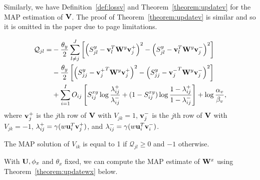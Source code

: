 Similarly, we have Definition~\ref{def:lossv} and Theorem~\ref{theorem:updatev} for the \mbox{MAP} estimation of $ {\bf V} $. The proof of Theorem~\ref{theorem:updatev} is similar and so it is omitted in the paper due to page limitations.

\begin{mydef}
\begin{align}
\mathcal{Q}_{jl} =&-\frac{\theta_{y}}{2}\sum_{l\neq j}^{J}\left[\left(S^{y}_{jl}-{\bf v}_l^T{\bf W}^y{\bf v}_{j}^{+}\right)^2-\left(S^{y}_{jl}-{\bf v}_l^T{\bf W}^y{\bf v}_{j}^{-}\right)^2\right]\nonumber\\
&-\frac{\theta_{y}}{2}\left[\left(S^{y}_{jj}-{{\bf v}_{j}^{+}}^T{\bf W}^y{\bf v}_{j}^{+}\right)^2-\left(S^{y}_{jj}-{{\bf v}_{j}^{-}}^T{\bf W}^y{\bf v}_{j}^{-}\right)^2\right]\nonumber\\
&+\sum_{i=1}^{I}O_{ij}\left[S_{ij}^{xy}\log \frac{\lambda_{ij}^{+}}{\lambda_{ij}^{-}} + (1-S_{ij}^{xy})\log \frac{1-\lambda_{ij}^{+}}{1-\lambda_{ij}^{-}}\right]+\log\frac{\alpha_v}{\beta_v},\nonumber
\end{align}
where $ {\bf v}^{+}_j $ is the $ j $th row of $ {\bf V}  $ with $ V_{jk}=1 $, $ {\bf v}^{-}_j $ is the $ j $th row of $ {\bf V} $ with $ V_{jk}=-1 $, $ \lambda^{+}_{ij} = \gamma(w{\bf u}_i^T{\bf v}_j^{+}) $, and $ \lambda^{-}_{ij} = \gamma(w{\bf u}_i^T{\bf v}_i^{-}) $.
\label{def:lossv}\end{mydef}


\begin{mythe}
The \mbox{MAP} solution of $ V_{ik} $ is equal to 1 if $ \mathcal{Q}_{jl}\ge 0$ and $-1$ otherwise.
\label{theorem:updatev}\end{mythe}

With $ {\bf U} , \phi_{x}  $ and $ \theta_{x} $ fixed, we can compute the \mbox{MAP} estimate of $ {\bf W}^{x} $ using Theorem~\ref{theorem:updatewx} below. %


